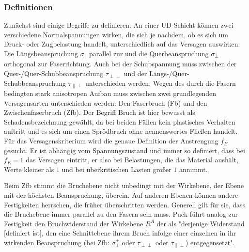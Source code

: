 \subsubsection{Definitionen}
Zunächst sind einige Begriffe zu definieren. An einer UD-Schicht können zwei verschiedene Normalspannungen wirken, die sich je nachdem, ob es sich um Druck- oder Zugbelastung handelt, unterschiedlich auf das Versagen auswirken: Die Längsbeanspruchung $\sigma_{\parallel}$ parallel zur und die Querbeanspruchung $\sigma_{\perp}$ orthogonal zur Faserrichtung. Auch bei der Schubspannung muss zwischen der Quer-/Quer-Schubbeanspruchung $\tau_{\perp\perp}$ und der Längs-/Quer-Schubbeanspruchung $\tau_{\parallel\perp}$ unterschieden werden. Wegen des durch die Fasern bedingten stark anisotropen Aufbau muss zwischen zwei grundlegenden Versagensarten unterschieden werden: Den Faserbruch (Fb) und den Zwischenfaserbruch (Zfb). Der Begriff Bruch ist hier bewusst als Schadensbezeichnung gewählt, da bei beiden Fällen kein plastisches Verhalten auftritt und es sich um einen Sprödbruch ohne nennenswertes Fließen handelt.
Für das Versagenskriterium wird die genaue Definition der Anstrengung $f_E$ gesucht. Er ist abhängig vom Spannungszustand und immer so definiert, dass bei $f_E=1$ das Versagen eintritt, er also bei Belastungen, die das Material aushält, Werte kleiner als $1$ und bei überkritischen Lasten größer $1$ annimmt.

Beim Zfb stimmt die Bruchebene nicht unbedingt mit der Wirkebene, der Ebene mit der höchsten Beanspruchung, überein. Auf anderen Ebenen können andere Festigkeiten herrschen, die früher überschritten werden. Generell gilt für sie, dass die Bruchebene immer parallel zu den Fasern sein muss. Puck führt analog zur Festigkeit den Bruchwiderstand der Wirkebene $R^A$ der als "derjenige Widerstand [definiert ist], den eine Schnittebene ihrem Bruch infolge einer einzelnen in ihr wirkenden Beanspruchung (bei Zfb: $\sigma_\perp^+$ oder $\tau_{\perp\perp}$ oder $\tau_{\parallel\perp}$) entgegensetzt"\cite{item3}.
